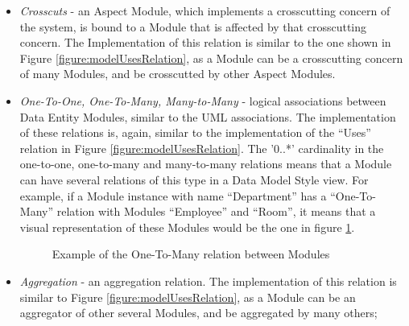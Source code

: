 \documentclass{llncs}
\begin{document}
\begin{itemize}
\item \textit{Crosscuts} - an Aspect Module, which implements a crosscutting concern of the system, is bound to a Module that is affected by that crosscutting concern. The Implementation of this relation is similar to the one shown in Figure \ref{figure:modelUsesRelation}, as a Module can be a crosscutting concern of many Modules, and be crosscutted by other Aspect Modules.

\item \textit{One-To-One, One-To-Many, Many-to-Many} - logical associations between Data Entity Modules, similar to the UML associations. The implementation of these relations is, again, similar to the implementation of the ``Uses'' relation in Figure \ref{figure:modelUsesRelation}. The '0..*' cardinality in the one-to-one, one-to-many and many-to-many relations means that a Module can have several relations of this type in a Data Model Style view. For example, if a Module instance with name ``Department'' has a ``One-To-Many'' relation with Modules ``Employee'' and ``Room'', it means that a visual representation of these Modules would be the one in figure \ref{figure:modelOneToManyExample}.
\begin{figure}
\centering
\renewcommand {\umltextcolor}{black}
\renewcommand {\umlfillcolor}{none}
\renewcommand {\umldrawcolor}{black}
\caption{Example of the One-To-Many relation between Modules}
\label{figure:modelOneToManyExample}
\end{figure}

\item \textit{Aggregation} - an aggregation relation. The implementation of this relation is similar to Figure \ref{figure:modelUsesRelation}, as a Module can be an aggregator of other several Modules, and be aggregated by many others;
\end{itemize}
\end{document}
